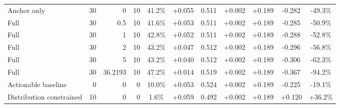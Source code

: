 \begin{table}[htbp]
\begin{tabular}{lrrrccccccc}
Anchor only & 30 & 0 & 10 & 41.2\% & +0.055 & 0.511 & +0.002 & +0.189 & -0.282 & -49.3\% \\
Full & 30 & 0.5 & 10 & 41.6\% & +0.053 & 0.511 & +0.002 & +0.189 & -0.285 & -50.9\% \\
Full & 30 & 1 & 10 & 42.8\% & +0.052 & 0.511 & +0.002 & +0.189 & -0.288 & -52.8\% \\
Full & 30 & 2 & 10 & 43.2\% & +0.047 & 0.512 & +0.002 & +0.189 & -0.296 & -56.8\% \\
Full & 30 & 5 & 10 & 43.2\% & +0.040 & 0.512 & +0.002 & +0.189 & -0.306 & -62.3\% \\
Full & 30 & 36.2193 & 10 & 47.2\% & +0.014 & 0.519 & +0.002 & +0.189 & -0.367 & -94.2\% \\
Actionable baseline & 0 & 0 & 0 & 10.0\% & +0.053 & 0.524 & +0.002 & +0.189 & -0.225 & -19.1\% \\
Distribution constrained & 10 & 0 & 0 & 1.6\% & +0.059 & 0.492 & +0.002 & +0.189 & +0.120 & +36.2\% \\
\bottomrule
\end{tabular}
\end{table}